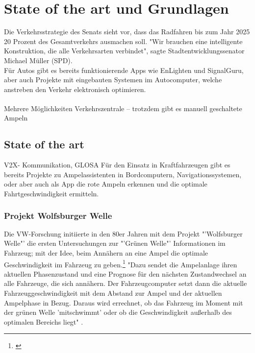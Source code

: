 \chapter{State of the art und Grundlagen}
Die Verkehrsstrategie des Senats sieht vor, dass das Radfahren bis zum Jahr 2025 20 Prozent des Gesamtverkehrs ausmachen soll. \cite{Mopo}
"Wir brauchen eine intelligente Konstruktion, die alle Verkehrsarten verbindet", sagte Stadtentwicklungssenator Michael Müller (SPD).\\
Für Autos gibt es bereits funktionierende \gls{App}s wie EnLighten und SignalGuru, aber auch Projekte mit eingebauten Systemen im Autocomputer, welche anstreben den Verkehr elektronisch optimieren.\\\\
Mehrere Möglichkeiten
Verkehrszentrale -- trotzdem gibt es manuell geschaltete Ampeln\\
\section{State of the art}
\gls{V2X}- Kommunikation, GLOSA
Für den Einsatz in Kraftfahrzeugen gibt es bereits Projekte zu Ampelassistenten in Bordcomputern, Navigationssystemen, oder aber auch als App die rote Ampeln erkennen und die optimale Fahrtgeschwindigkeit ermitteln.
\subsection{Projekt Wolfsburger Welle}
Die \gls{VW}-Forschung initiierte in den 80er Jahren mit dem Projekt "'Wolfsburger Welle"' die ersten Untersuchungen zur "'Grünen Welle"' Informationen im Fahrzeug; mit der Idee, beim Annähern an eine Ampel die optimale Geschwindigkeit im Fahrzeug zu geben.\footnote{\cite{Welle}} "Dazu sendet die Ampelanlage ihren aktuellen Phasenzustand und eine Prognose für den nächsten Zustandwechsel an alle Fahrzeuge, die sich annähern. Der Fahrzeugcomputer setzt dann die aktuelle Fahrzeuggeschwindigkeit mit dem Abstand zur Ampel und der aktuellen Ampelphase in Bezug. Daraus wird errechnet, ob das Fahrzeug im Moment mit der grünen Welle ’mitschwimmt’ oder ob die Geschwindigkeit außerhalb des optimalen Bereichs liegt" \cite{MenschMaschine}.

